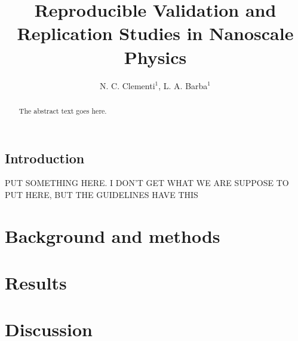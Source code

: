\documentclass[openacc]{rstransa} %
\begin{document}
\title{Reproducible Validation and Replication Studies in Nanoscale Physics}

\author{%
N. C. Clementi$^{1}$, L. A. Barba$^{1}$}

\address{$^{1}$Department of Mechanical and Aerospace Engineering, 
The George Washington University, Washington D.C., USA }

\subject{xxxxx, xxxxx, xxxx}



\begin{abstract}
    The abstract text goes here. 
\end{abstract}
    
    
\begin{fmtext}  
\section{Introduction}

PUT SOMETHING HERE. I DON'T GET WHAT WE ARE SUPPOSE TO PUT HERE, BUT THE GUIDELINES HAVE THIS

\end{fmtext}

\maketitle
\section{Background and methods}\label{sec:background}


\section{Results} \label{sec:results}



\section{Discussion}\label{sec:discussion}


\newpage

\end{document}
